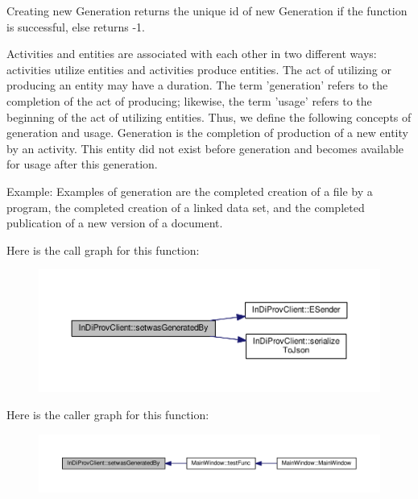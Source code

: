 Creating new Generation returns the unique id of new Generation if the function is successful, else returns -\/1. 

Activities and entities are associated with each other in two different ways\-: activities utilize entities and activities produce entities. The act of utilizing or producing an entity may have a duration. The term 'generation' refers to the completion of the act of producing; likewise, the term 'usage' refers to the beginning of the act of utilizing entities. Thus, we define the following concepts of generation and usage. Generation is the completion of production of a new entity by an activity. This entity did not exist before generation and becomes available for usage after this generation.\par
 Example\-: Examples of generation are the completed creation of a file by a program, the completed creation of a linked data set, and the completed publication of a new version of a document. 

Here is the call graph for this function\-:
\nopagebreak
\begin{figure}[H]
\begin{center}
\leavevmode
\includegraphics[width=350pt]{class_in_di_prov_client_a30aa922f818e6a6104185c9a11191acb_cgraph}
\end{center}
\end{figure}




Here is the caller graph for this function\-:
\nopagebreak
\begin{figure}[H]
\begin{center}
\leavevmode
\includegraphics[width=350pt]{class_in_di_prov_client_a30aa922f818e6a6104185c9a11191acb_icgraph}
\end{center}
\end{figure}


